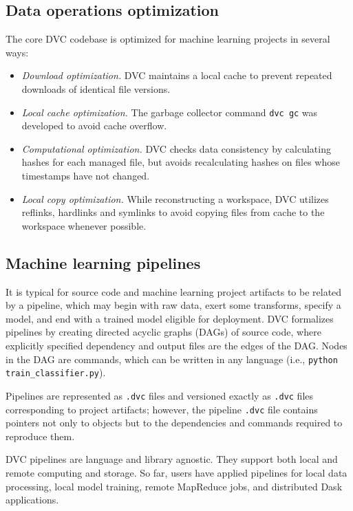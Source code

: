 \documentclass[10pt,sigconf, authordraft]{acmart}
\begin{document}
\subsection{Data operations optimization} \label{optimize}
The core DVC codebase is optimized for machine learning projects in several ways:
\begin{itemize}
    \item \textit{Download optimization.} DVC maintains a local cache to prevent repeated downloads of identical file versions.
    \item \textit{Local cache optimization.} The garbage collector command \verb|dvc gc| was developed to avoid cache overflow.
    \item \textit{Computational optimization.} DVC checks data consistency by calculating hashes for each managed file, but avoids recalculating hashes on files whose timestamps have not changed.
    \item \textit{Local copy optimization.} While reconstructing a workspace, DVC utilizes reflinks, hardlinks and symlinks to avoid copying files from cache to the workspace whenever possible. 
\end{itemize}


\subsection{Machine learning pipelines} \label{pipeline}
It is typical for source code and machine learning project artifacts to be related by a pipeline, which may begin with raw data, exert some transforms, specify a model, and end with a trained model eligible for deployment. DVC formalizes pipelines by creating directed acyclic graphs (DAGs) of source code, where explicitly specified dependency and output files are the edges of the DAG. Nodes in the DAG are commands, which can be written in any language (i.e., \verb|python train_classifier.py|).  

Pipelines are represented as \verb|.dvc| files and versioned exactly as \verb|.dvc| files corresponding to project artifacts; however, the pipeline \verb|.dvc| file contains pointers not only to objects but to the dependencies and commands required to reproduce them. 

DVC pipelines are language and library agnostic. They support both local and remote computing and storage. So far, users have applied pipelines for local data processing, local model training, remote MapReduce jobs, and distributed Dask applications. 
\end{document}
